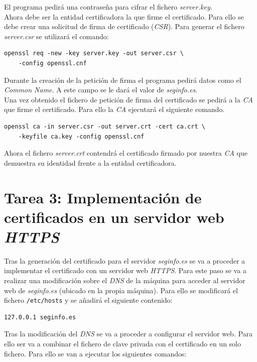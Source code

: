 \documentclass[10pt,a4paper]{article}
\begin{document}
El programa pedirá una contraseña para cifrar el fichero \emph{server.key}.\\
Ahora debe ser la entidad certificadora la que firme el certificado. Para ello se debe crear una solicitud de firma de certificado (\emph{CSR}). Para generar el fichero \emph{server.csr} se utilizará el comando:

\begin{lstlisting}
openssl req -new -key server.key -out server.csr \ 
	-config openssl.cnf
\end{lstlisting}

Durante la creación de la petición de firma el programa pedirá datos como el \emph{Common Name}. A este campo se le dará el valor de \emph{seginfo.es}.\\
Una vez obtenido el fichero de petición de firma del certificado se pedirá a la \emph{CA} que firme el certificado. Para ello la \emph{CA} ejecutará el siguiente comando.

\begin{lstlisting}
openssl ca -in server.csr -out server.crt -cert ca.crt \
	-keyfile ca.key -config openssl.cnf
\end{lstlisting}

Ahora el fichero \emph{server.crt} contendrá el certificado firmado por nuestra \emph{CA} que demuestra su identidad frente a la entidad certificadora.


\section{Tarea 3: Implementación de certificados en un servidor web \emph{HTTPS}}

Tras la generación del certificado para el servidor \emph{seginfo.es} se va a proceder a implementar el certificado con un servidor web \emph{HTTPS}. Para este paso se va a realizar una modificación sobre el \emph{DNS} de la máquina para acceder al servidor web de \emph{seginfo.es} (ubicado en la propia máquina). Para ello se modificará el fichero \texttt{/etc/hosts} y se añadirá el siguiente contenido:

\begin{lstlisting}
127.0.0.1 seginfo.es
\end{lstlisting}

Tras la modificación del \emph{DNS} se va a proceder a configurar el servidor web. Para ello ser va a combinar el fichero de clave privada con el certificado en un solo fichero. Para ello se van a ejecutar los siguientes comandos:
\end{document}
